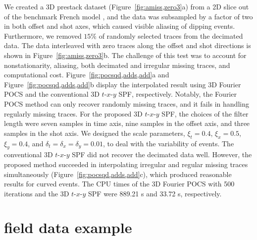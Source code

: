 We created a 3D prestack dataset (Figure~\ref{fig:amiss,zero3}a) from
a 2D slice out of the benchmark French model \cite[]{French74}, and
the data was subsampled by a factor of two in both offset and shot
axes, which caused visible aliasing of dipping events. Furthermore, we
removed $15\%$ of randomly selected traces from the decimated
data. The data interleaved with zero traces along the offset and shot
directions is shown in Figure~\ref{fig:amiss,zero3}b.  The challenge
of this test was to account for nonstationarity, aliasing, both
decimated and irregular missing traces, and computational cost.
Figure~\ref{fig:pocsqd,adds,add}a and
Figure~\ref{fig:pocsqd,adds,add}b display the interpolated result
using 3D Fourier POCS and the conventional 3D $t$-$x$-$y$ SPF,
respectively. Notably, the Fourier POCS method can only recover
randomly missing traces, and it fails in handling regularly missing
traces. For the proposed 3D $t$-$x$-$y$ SPF, the choices of the filter
length were seven samples in time axis, nine samples in the offset
axis, and three samples in the shot axis. We designed the scale
parameters, $\xi_t=0.4$, $\xi_x=0.5$, $\xi_y=0.4$, and
$\delta_t=\delta_x=\delta_y=0.01$, to deal with the variability of
events. The conventional 3D $t$-$x$-$y$ SPF did not recover the decimated
data well. However, the proposed method succeeded in interpolating
irregular and regular missing traces simultaneously
(Figure~\ref{fig:pocsqd,adds,add}c), which produced reasonable results
for curved events. The CPU times of the 3D Fourier POCS with 500
iterations and the 3D $t$-$x$-$y$ SPF were 889.21 s and 33.72 s,
respectively.


\section{field data example}

